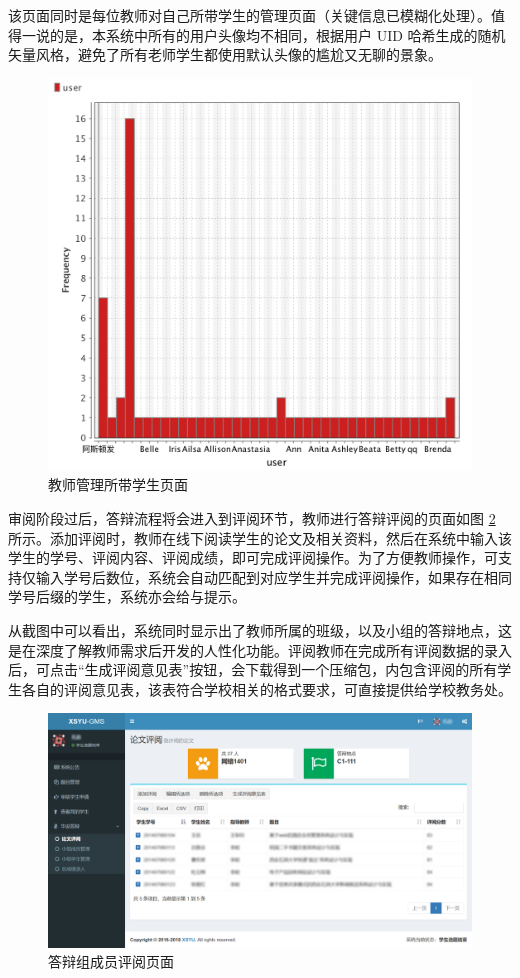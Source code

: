 该页面同时是每位教师对自己所带学生的管理页面（关键信息已模糊化处理）。值得一说的是，本系统中所有的用户头像均不相同，根据用户 UID 哈希生成的随机矢量风格，避免了所有老师学生都使用默认头像的尴尬又无聊的景象。

\begin{figure}
	\centering
	\includegraphics[width=\linewidth]{figure/5-1}
	\caption{教师管理所带学生页面}
	\label{tealook}
\end{figure}

审阅阶段过后，答辩流程将会进入到评阅环节，教师进行答辩评阅的页面如图 \ref{tea-review} 所示。添加评阅时，教师在线下阅读学生的论文及相关资料，然后在系统中输入该学生的学号、评阅内容、评阅成绩，即可完成评阅操作。为了方便教师操作，可支持仅输入学号后数位，系统会自动匹配到对应学生并完成评阅操作，如果存在相同学号后缀的学生，系统亦会给与提示。

从截图中可以看出，系统同时显示出了教师所属的班级，以及小组的答辩地点，这是在深度了解教师需求后开发的人性化功能。评阅教师在完成所有评阅数据的录入后，可点击“生成评阅意见表”按钮，会下载得到一个压缩包，内包含评阅的所有学生各自的评阅意见表，该表符合学校相关的格式要求，可直接提供给学校教务处。

\begin{figure}
	\centering
	\includegraphics[width=\linewidth]{figure/tea-review}
	\caption{答辩组成员评阅页面}
	\label{tea-review}
\end{figure}

